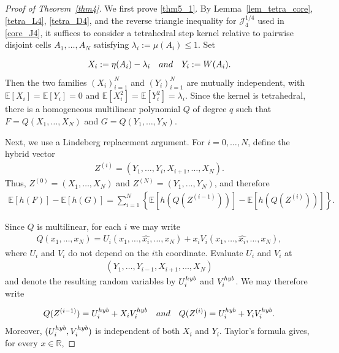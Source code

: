 \documentclass[10pt,a4paper]{amsart}
\newcommand{\AND}{\quad{\rm and}\quad}
\newcommand{\E}{\mathbb{E}}
\newcommand{\Jfour}{\mathcal J_4}
\newcommand{\R}{\mathbb{R}}
\newcommand{\noi}{\noindent}
\begin{document}
\begin{proof}[Proof of Theorem~\ref{thm4}]

We first prove \eqref{thm5_1}.  By Lemma~\ref{lem_tetra_core},
\eqref{tetra_L4}, \eqref{tetra_D4}, and the reverse triangle
inequality for $\Jfour^{1/4}$ used in \eqref{core_J4}, it suffices to
consider a tetrahedral step kernel relative to pairwise disjoint cells
$A_1,\ldots,A_N$ satisfying $\lambda_i:=\mu(A_i)\leq1$.
Set

\noi
\begin{align*}
 X_i:=\eta(A_i)-\lambda_i
 \AND
 Y_i:=W(A_i).
\end{align*}
Then the two families $(X_i)_{i=1}^N$ and $(Y_i)_{i=1}^N$ are
mutually independent, with $\E[X_i]=\E[Y_i]=0$ and
$\E[X_i^2]=\E[Y_i^2]=\lambda_i$.
Since the kernel is tetrahedral, there is a homogeneous multilinear
polynomial $Q$ of degree $q$ such that
$ F=Q(X_1,\ldots,X_N)$ and $G=Q(Y_1,\ldots,Y_N)$.


Next, we use a Lindeberg replacement argument.  For $i=0,\ldots,N$, define
the hybrid vector
\noi
\begin{align*}
 Z^{(i)}=(Y_1,\ldots,Y_i,X_{i+1},\ldots,X_N).
\end{align*}
Thus, $Z^{(0)}=(X_1,\ldots,X_N)$ and
$Z^{(N)}=(Y_1,\ldots,Y_N)$, and therefore
\noi
\begin{align}
 \E[h(F)]-\E[h(G)]
 =
 \sum_{i=1}^N
 \left\{
 \E[h(Q(Z^{(i-1)}))]
 -
 \E[h(Q(Z^{(i)}))]
 \right\}.
 \label{Lind_tel}
\end{align}

Since $Q$ is multilinear, for each $i$ we may write
\noi
\begin{align*}
 Q(x_1,\ldots,x_N)
 =
 U_i(x_1,\ldots,\widehat{x_i},\ldots,x_N)
 +
 x_iV_i(x_1,\ldots,\widehat{x_i},\ldots,x_N),
\end{align*}
where $U_i$ and $V_i$ do not depend on the $i$th coordinate.
Evaluate $U_i$ and $V_i$ at
\noi
\begin{align*}
 (Y_1,\ldots,Y_{i-1},X_{i+1},\ldots,X_N)
\end{align*}
and denote the resulting random variables by
$U_i^{\rm hyb}$ and $V_i^{\rm hyb}$.  We may therefore write

\noi
\begin{align*}
 Q(Z^{(i-1)})
 =
 U_i^{\rm hyb}+X_iV_i^{\rm hyb}
 \AND
 Q(Z^{(i)})
 =
 U_i^{\rm hyb}+Y_iV_i^{\rm hyb}.
\end{align*}
Moreover, $(U_i^{\rm hyb},V_i^{\rm hyb})$ is independent of both
$X_i$ and $Y_i$.  Taylor's formula gives, for every $x\in\R$,


\end{proof}
\end{document}
